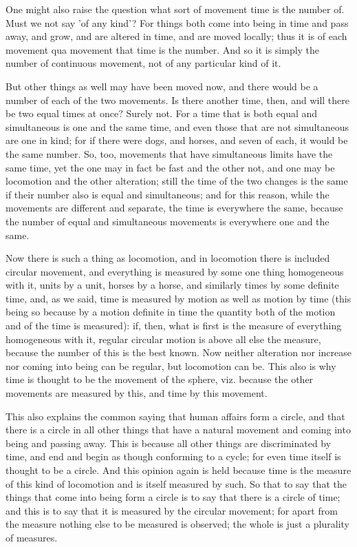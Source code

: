 One might also raise the question what sort of movement time is the
number of. Must we not say 'of any kind'? For things both come into
being in time and pass away, and grow, and are altered in time, and
are moved locally; thus it is of each movement qua movement that time
is the number. And so it is simply the number of continuous movement,
not of any particular kind of it. 

But other things as well may have been moved now, and there would
be a number of each of the two movements. Is there another time, then,
and will there be two equal times at once? Surely not. For a time
that is both equal and simultaneous is one and the same time, and
even those that are not simultaneous are one in kind; for if there
were dogs, and horses, and seven of each, it would be the same number.
So, too, movements that have simultaneous limits have the same time,
yet the one may in fact be fast and the other not, and one may be
locomotion and the other alteration; still the time of the two changes
is the same if their number also is equal and simultaneous; and for
this reason, while the movements are different and separate, the time
is everywhere the same, because the number of equal and simultaneous
movements is everywhere one and the same. 

Now there is such a thing as locomotion, and in locomotion there is
included circular movement, and everything is measured by some one
thing homogeneous with it, units by a unit, horses by a horse, and
similarly times by some definite time, and, as we said, time is measured
by motion as well as motion by time (this being so because by a motion
definite in time the quantity both of the motion and of the time is
measured): if, then, what is first is the measure of everything homogeneous
with it, regular circular motion is above all else the measure, because
the number of this is the best known. Now neither alteration nor increase
nor coming into being can be regular, but locomotion can be. This
also is why time is thought to be the movement of the sphere, viz.
because the other movements are measured by this, and time by this
movement. 

This also explains the common saying that human affairs form a circle,
and that there is a circle in all other things that have a natural
movement and coming into being and passing away. This is because all
other things are discriminated by time, and end and begin as though
conforming to a cycle; for even time itself is thought to be a circle.
And this opinion again is held because time is the measure of this
kind of locomotion and is itself measured by such. So that to say
that the things that come into being form a circle is to say that
there is a circle of time; and this is to say that it is measured
by the circular movement; for apart from the measure nothing else
to be measured is observed; the whole is just a plurality of measures.

